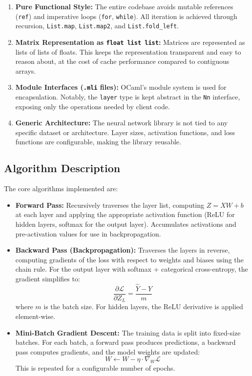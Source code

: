 \documentclass[12pt, a4paper]{article}
\begin{document}
\begin{enumerate}[leftmargin=1.5cm]
    \item \textbf{Pure Functional Style:} The entire codebase avoids mutable references (\texttt{ref}) and imperative loops (\texttt{for}, \texttt{while}). All iteration is achieved through recursion, \texttt{List.map}, \texttt{List.map2}, and \texttt{List.fold\_left}.
    
    \item \textbf{Matrix Representation as \texttt{float list list}:} Matrices are represented as lists of lists of floats. This keeps the representation transparent and easy to reason about, at the cost of cache performance compared to contiguous arrays.
    
    \item \textbf{Module Interfaces (\texttt{.mli} files):} OCaml's module system is used for encapsulation. Notably, the \texttt{layer} type is kept abstract in the \texttt{Nn} interface, exposing only the operations needed by client code.
    
    \item \textbf{Generic Architecture:} The neural network library is not tied to any specific dataset or architecture. Layer sizes, activation functions, and loss functions are configurable, making the library reusable.
\end{enumerate}

\subsection{Algorithm Description}

The core algorithms implemented are:

\begin{itemize}[leftmargin=1.5cm]
    \item \textbf{Forward Pass:} Recursively traverses the layer list, computing $Z = XW + b$ at each layer and applying the appropriate activation function (ReLU for hidden layers, softmax for the output layer). Accumulates activations and pre-activation values for use in backpropagation.
    
    \item \textbf{Backward Pass (Backpropagation):} Traverses the layers in reverse, computing gradients of the loss with respect to weights and biases using the chain rule. For the output layer with softmax + categorical cross-entropy, the gradient simplifies to:
    \[
        \frac{\partial \mathcal{L}}{\partial Z_L} = \frac{\hat{Y} - Y}{m}
    \]
    where $m$ is the batch size. For hidden layers, the ReLU derivative is applied element-wise.
    
    \item \textbf{Mini-Batch Gradient Descent:} The training data is split into fixed-size batches. For each batch, a forward pass produces predictions, a backward pass computes gradients, and the model weights are updated:
    \[
        W \leftarrow W - \eta \cdot \nabla_W \mathcal{L}
    \]
    This is repeated for a configurable number of epochs.
\end{itemize}
\end{document}
